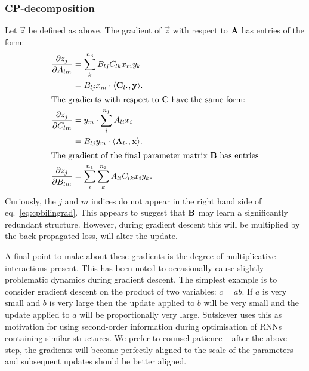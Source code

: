 \subsubsection{CP-decomposition}

Let \(\vec{z}\) be defined as above.
The gradient of \(\vec{z}\) with respect to \(\mathbf{A}\) has entries of the form:
\begin{align}
	\frac{\partial z_j}{\partial A_{lm}} &= \sum_k^{n_3}B_{lj}C_{lk}x_my_k \\
		&= B_{lj}x_m \cdot \langle\vec{C}_{l\midbullet}, \vec{y}\rangle.\\
\intertext{The gradients with respect to \(\mat{C}\) have the same form:}
	\frac{\partial z_j}{\partial C_{lm}} &= y_m \cdot \sum_i^{n_1}A_{li}x_i \\
		&= B_{lj}y_m \cdot \langle\vec{A}_{l\midbullet}, \vec{x}\rangle.\\
\intertext{The gradient of the final parameter matrix \(\mat{B}\) has entries}
	\frac{\partial z_j}{\partial B_{lm}} &= 
		\sum_i^{n_1}\sum_k^{n_3}A_{li}C_{lk}x_iy_k. \label{eq:cpbilingrad}
\end{align}
Curiously, the \(j\) and \(m\) indices do not appear in the right hand side of 
eq.~\eqref{eq:cpbilingrad}. This appears to suggest that \(\mathbf{B}\) may learn a significantly
redundant structure. However, during gradient descent this will be multiplied by the back-propagated
loss, will alter the update.

A final point to make about these gradients is the degree of multiplicative interactions present.
This has been noted to occasionally cause slightly problematic dynamics during gradient descent. The
simplest example is to consider
gradient descent on the product of two variables: \(c = ab\). If \(a\) is very small and \(b\) is
very large then the update applied to \(b\) will be very small and the update applied to \(a\) will
be proportionally very large. Sutskever \autocite{Sutskever2013} uses this as motivation for using
second-order information during optimisation of RNNs containing similar structures. We prefer to
counsel patience -- after the above step, the gradients will become perfectly aligned to the scale
of the parameters and subsequent updates should be better aligned.



